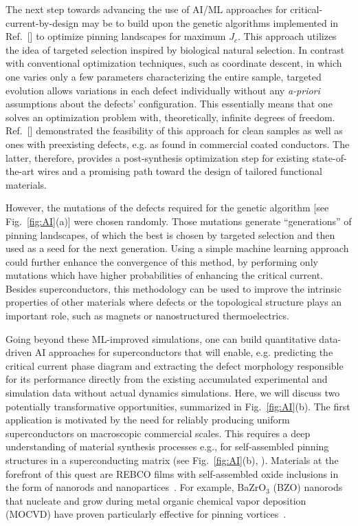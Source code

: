 \documentclass[%
 aip,
 amsmath,amssymb,
 reprint,%
floatfix]{revtex4-1}
\newcommand{\Jc}{J_{c}}
\newcommand{\circled}[1]{\tikz[baseline=(char.base)]{\node[shape=circle,draw,fill=lightgray,inner sep=0.7pt] (char) {#1};}}
\begin{document}
The next step towards advancing the use of AI/ML approaches for critical-current-by-design may be to build upon the genetic algorithms implemented in Ref.~[] to optimize pinning landscapes for maximum $\Jc$. This approach utilizes the idea of targeted selection inspired by biological natural selection. In contrast with conventional optimization techniques, such as coordinate descent, in which one varies only a few parameters characterizing the entire sample, targeted evolution allows variations in each defect individually without any \textit{a-priori} assumptions about the defects' configuration. This essentially means that one solves an optimization problem with, theoretically, infinite degrees of freedom. Ref.~[] demonstrated the feasibility of this approach for clean samples as well as ones with preexisting defects, e.g. as found in commercial coated conductors. The latter, therefore, provides a post-synthesis optimization step for existing state-of-the-art wires and a promising path toward the design of tailored functional materials.


However, the mutations of the defects required for the genetic algorithm [see Fig.~\ref{fig:AI}(a)] were chosen randomly. Those mutations generate ``generations'' of pinning landscapes, of which the best is chosen by targeted selection and then used as a seed for the next generation. Using a simple machine learning approach could further enhance the convergence of this method, by performing only mutations which have higher probabilities of enhancing the critical current. Besides superconductors, this methodology can be used to improve the intrinsic properties of other materials where defects or the topological structure plays an important role, such as magnets or nanostructured thermoelectrics.

Going beyond these ML-improved simulations, one can build quantitative data-driven AI approaches for superconductors that will enable, e.g. predicting the critical current phase diagram and extracting the defect morphology responsible for its performance directly from the existing accumulated experimental and simulation data without actual dynamics simulations.  Here, we will discuss two potentially transformative opportunities, summarized in Fig.~\ref{fig:AI}(b).  The first application is motivated by the need for reliably producing uniform superconductors on macroscopic commercial scales. This requires a deep understanding of material synthesis processes e.g., for self-assembled pinning structures in a superconducting matrix (see Fig.~\ref{fig:AI}(b), \textbf{\circled{1}}). Materials at the forefront of this quest are REBCO films with self-assembled oxide inclusions in the form of nanorods and nanopartices~\cite{Obradors2014, ROPP}. For example, BaZrO$_3$ (BZO) nanorods that nucleate and grow during metal organic chemical vapor deposition (MOCVD) have proven particularly effective for pinning vortices~\cite{majkic2017}.  
\end{document}
